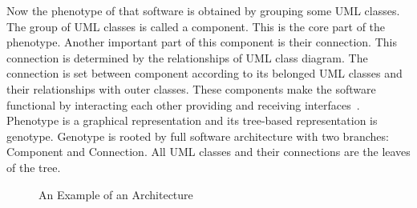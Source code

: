 \documentclass[letterpaper, 10 pt, conference]{ieeeconf}  %
\begin{document}
Now the phenotype of that software is obtained by grouping some UML classes. The group of UML classes is called a component. This is the core part of the phenotype. Another important part of this component is their connection. This connection is determined by the relationships of UML class diagram. The connection is set between component according to its belonged UML classes and their relationships with outer classes.  These components make the software functional by interacting each other providing and receiving interfaces~\cite{szyperski1999component}. Phenotype is a graphical representation and its tree-based representation is genotype.  Genotype is rooted by full software architecture with two branches: Component and Connection. All UML classes and their connections are the leaves of the tree.



\begin{figure}[!h] \label{geno_example}
\centering 
 
	\hspace{0em}	
\caption{An Example of an Architecture}
\end{figure}
\end{document}
